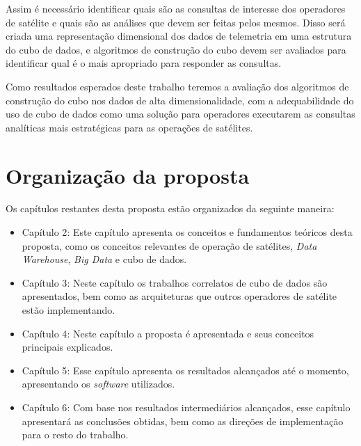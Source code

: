 Assim é necessário identificar quais são as consultas de interesse dos operadores de satélite e quais são as análises que devem ser feitas pelos mesmos.
Disso será criada uma representação dimensional dos dados de telemetria em uma estrutura do cubo de dados, e  algoritmos de construção do cubo devem ser avaliados para identificar qual é o mais apropriado para responder as consultas.

{\color{cerulean}
Como resultados esperados deste trabalho teremos a avaliação dos algoritmos de construção do cubo nos dados de alta dimensionalidade, com a adequabilidade do uso de cubo de dados como uma solução para operadores executarem as consultas analíticas mais estratégicas para as operações de satélites.
}

\section{Organização da proposta}\label{ch:intro:org}

Os capítulos restantes desta proposta estão organizados da seguinte maneira:

\begin{itemize}
	\item{Capítulo 2}: Este capítulo apresenta os conceitos e fundamentos teóricos desta proposta, como os conceitos relevantes de operação de satélites, \textit{Data Warehouse}, \textit{Big Data} e cubo de dados.
	\item{Capítulo 3}: Neste capítulo os trabalhos correlatos de cubo de dados são apresentados, bem como as arquiteturas que outros operadores de satélite estão implementando.
	\item{Capítulo 4}: Neste capítulo a proposta é apresentada e seus conceitos principais explicados.
  \item{Capítulo 5}: Esse capítulo apresenta os resultados alcançados até o momento, apresentando os \textit{software} utilizados.
	\item{Capítulo 6}: Com base nos resultados intermediários alcançados, esse capítulo apresentará as conclusões obtidas, bem como as direções de implementação para o resto do trabalho.
\end{itemize}

